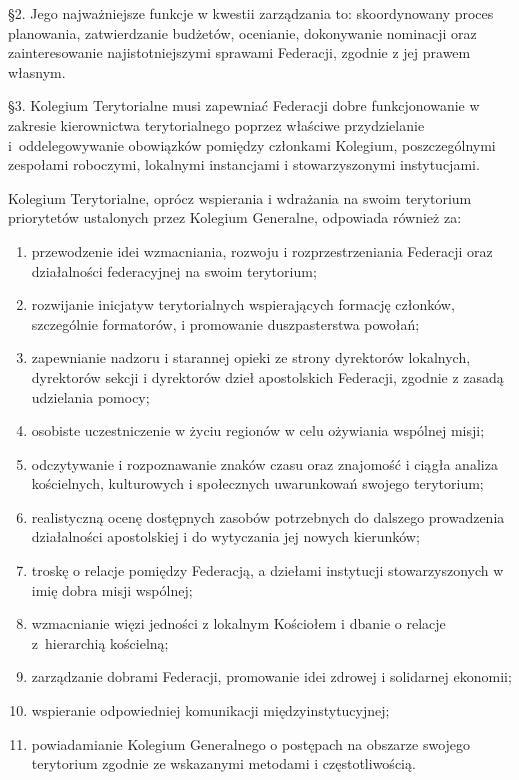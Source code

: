 \S{}2. Jego najważniejsze funkcje w kwestii zarządzania to: skoordynowany proces planowania, zatwierdzanie budżetów, ocenianie, dokonywanie nominacji oraz zainteresowanie najistotniejszymi sprawami Federacji, zgodnie z jej prawem własnym.

\S{}3. Kolegium Terytorialne musi zapewniać Federacji dobre funkcjonowanie w zakresie kierownictwa terytorialnego poprzez właściwe przydzielanie \mbox{i oddelegowywanie} obowiązków pomiędzy członkami Kolegium, poszczególnymi zespołami roboczymi, lokalnymi instancjami i stowarzyszonymi instytucjami.

 Kolegium Terytorialne, oprócz wspierania i wdrażania na swoim terytorium priorytetów ustalonych przez Kolegium Generalne, odpowiada również za:
\begin{enumerate}
	
	\item przewodzenie idei wzmacniania, rozwoju i rozprzestrzeniania Federacji oraz działalności federacyjnej na swoim terytorium;
	
	\item rozwijanie inicjatyw terytorialnych wspierających formację członków, szczególnie formatorów, i promowanie duszpasterstwa powołań;
	
	\item zapewnianie nadzoru i starannej opieki ze strony dyrektorów lokalnych, dyrektorów sekcji i dyrektorów dzieł apostolskich Federacji, zgodnie z zasadą udzielania pomocy;
	
	\item osobiste uczestniczenie w życiu regionów w celu ożywiania wspólnej misji;
	
	\item odczytywanie i rozpoznawanie znaków czasu oraz znajomość i ciągła analiza kościelnych, kulturowych i społecznych uwarunkowań swojego terytorium;
	
	\item realistyczną ocenę dostępnych zasobów potrzebnych do dalszego prowadzenia działalności apostolskiej i do wytyczania jej nowych kierunków;
	
	\item troskę o relacje pomiędzy Federacją, a dziełami instytucji stowarzyszonych w imię dobra misji wspólnej;
	
	\item wzmacnianie więzi jedności z lokalnym Kościołem i dbanie o relacje \mbox{z hierarchią} kościelną;
	
	\item zarządzanie dobrami Federacji, promowanie idei zdrowej i solidarnej ekonomii;
	
	\item wspieranie odpowiedniej komunikacji międzyinstytucyjnej;
	
	\item powiadamianie Kolegium Generalnego o postępach na obszarze swojego terytorium zgodnie ze wskazanymi metodami i częstotliwością.
\end{enumerate}

